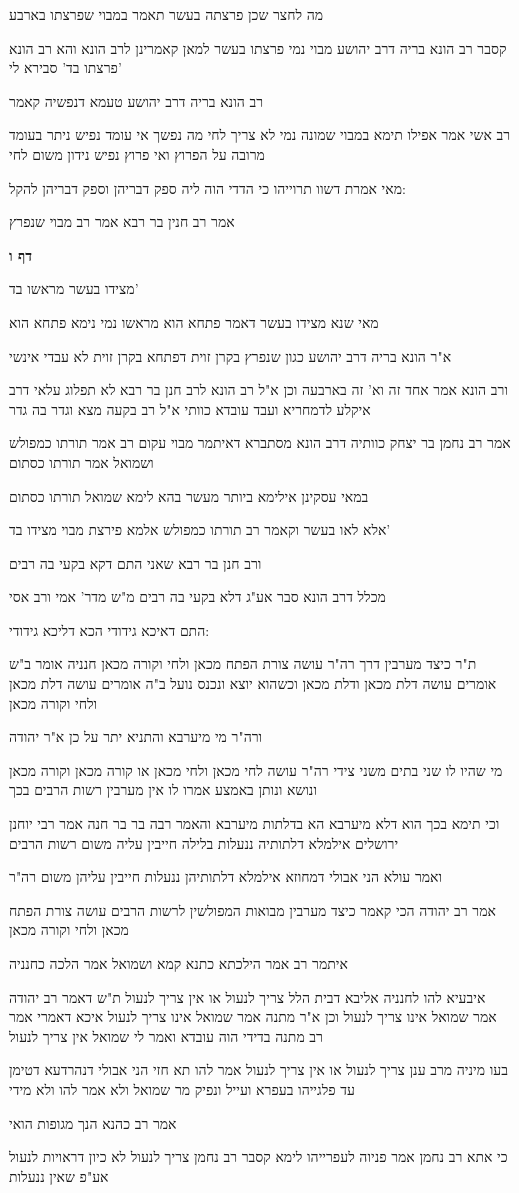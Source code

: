 \documentclass[12pt, openany]{book}
\newcommand{\sethebfont}{
\fontsize{10.5pt}{21.0pt} \selectfont
}
\newcommand{\textblock}[1]{
{\sethebfont #1\\}	
}
\newcommand{\sectname}{}
\newcommand{\newsection}[1]{
	\addcontentsline{toc}{section}{#1}
	\renewcommand{\sectname}{#1}	
	\vspace{-\baselineskip}
	\begin{center}
		\textbf{%
\fontsize{16pt}{16pt}\selectfont
			#1}
	\end{center}
	\vspace{-\baselineskip}
	\nopagebreak
}
\begin{document}
\textblock{מה לחצר שכן פרצתה בעשר תאמר במבוי שפרצתו בארבע}
\textblock{קסבר רב הונא בריה דרב יהושע מבוי נמי פרצתו בעשר למאן קאמרינן לרב הונא והא רב הונא פרצתו בד' סבירא לי'}
\textblock{רב הונא בריה דרב יהושע טעמא דנפשיה קאמר}
\textblock{רב אשי אמר אפילו תימא במבוי שמונה נמי לא צריך לחי מה נפשך אי עומד נפיש ניתר בעומד מרובה על הפרוץ ואי פרוץ נפיש נידון משום לחי}
\textblock{מאי אמרת דשוו תרוייהו כי הדדי הוה ליה ספק דבריהן וספק דבריהן להקל:}
\textblock{אמר רב חנין בר רבא אמר רב מבוי שנפרץ}
\newsection{דף ו}
\textblock{מצידו בעשר מראשו בד'}
\textblock{מאי שנא מצידו בעשר דאמר פתחא הוא מראשו נמי נימא פתחא הוא}
\textblock{א"ר הונא בריה דרב יהושע כגון שנפרץ בקרן זוית דפתחא בקרן זוית לא עבדי אינשי}
\textblock{ורב הונא אמר אחד זה וא' זה בארבעה וכן א"ל רב הונא לרב חנן בר רבא לא תפלוג עלאי דרב איקלע לדמחריא ועבד עובדא כוותי א"ל רב בקעה מצא וגדר בה גדר}
\textblock{אמר רב נחמן בר יצחק כוותיה דרב הונא מסתברא דאיתמר מבוי עקום רב אמר תורתו כמפולש ושמואל אמר תורתו כסתום}
\textblock{במאי עסקינן אילימא ביותר מעשר בהא לימא שמואל תורתו כסתום}
\textblock{אלא לאו בעשר וקאמר רב תורתו כמפולש אלמא פירצת מבוי מצידו בד'}
\textblock{ורב חנן בר רבא שאני התם דקא בקעי בה רבים}
\textblock{מכלל דרב הונא סבר אע"ג דלא בקעי בה רבים מ"ש מדר' אמי ורב אסי}
\textblock{התם דאיכא גידודי הכא דליכא גידודי:}
\textblock{ת"ר כיצד מערבין דרך רה"ר עושה צורת הפתח מכאן ולחי וקורה מכאן חנניה אומר ב"ש אומרים עושה דלת מכאן ודלת מכאן וכשהוא יוצא ונכנס נועל ב"ה אומרים עושה דלת מכאן ולחי וקורה מכאן}
\textblock{ורה"ר מי מיערבא והתניא יתר על כן א"ר יהודה}
\textblock{מי שהיו לו שני בתים משני צידי רה"ר עושה לחי מכאן ולחי מכאן או קורה מכאן וקורה מכאן ונושא ונותן באמצע אמרו לו אין מערבין רשות הרבים בכך}
\textblock{וכי תימא בכך הוא דלא מיערבא הא בדלתות מיערבא והאמר רבה בר בר חנה אמר רבי יוחנן ירושלים אילמלא דלתותיה ננעלות בלילה חייבין עליה משום רשות הרבים}
\textblock{ואמר עולא הני אבולי דמחוזא אילמלא דלתותיהן ננעלות חייבין עליהן משום רה"ר}
\textblock{אמר רב יהודה הכי קאמר כיצד מערבין מבואות המפולשין לרשות הרבים עושה צורת הפתח מכאן ולחי וקורה מכאן}
\textblock{איתמר רב אמר הילכתא כתנא קמא ושמואל אמר הלכה כחנניה}
\textblock{איבעיא להו לחנניה אליבא דבית הלל צריך לנעול או אין צריך לנעול ת"ש דאמר רב יהודה אמר שמואל אינו צריך לנעול וכן א"ר מתנה אמר שמואל אינו צריך לנעול איכא דאמרי אמר רב מתנה בדידי הוה עובדא ואמר לי שמואל אין צריך לנעול}
\textblock{בעו מיניה מרב ענן צריך לנעול או אין צריך לנעול אמר להו תא חזי הני אבולי דנהרדעא דטימן עד פלגייהו בעפרא ועייל ונפיק מר שמואל ולא אמר להו ולא מידי}
\textblock{אמר רב כהנא הנך מגופות הואי}
\textblock{כי אתא רב נחמן אמר פניוה לעפרייהו לימא קסבר רב נחמן צריך לנעול לא כיון דראויות לנעול אע"פ שאין ננעלות}
\end{document}

